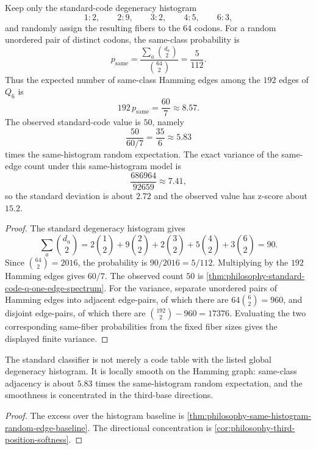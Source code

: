 \begin{theorem}
\label{thm:philosophy-same-histogram-random-edge-baseline}
Keep only the standard-code degeneracy histogram
$$
  1:2,\qquad 2:9,\qquad 3:2,\qquad 4:5,\qquad 6:3,
$$
and randomly assign the resulting fibers to the $64$ codons. For a
random unordered pair of distinct codons, the same-class probability is
$$
  p_{\mathrm{same}}
  =
  \frac{\sum_{a}\binom{d_{a}}{2}}{\binom{64}{2}}
  =
  \frac{5}{112}.
$$
Thus the expected number of same-class Hamming edges among the $192$
edges of $Q_{6}$ is
$$
  192\,p_{\mathrm{same}}
  =
  \frac{60}{7}
  \approx 8.57.
$$
The observed standard-code value is $50$, namely
$$
  \frac{50}{60/7}=\frac{35}{6}\approx5.83
$$
times the same-histogram random expectation.
The exact variance of the same-edge count under this same-histogram
model is
$$
  \frac{686964}{92659}\approx7.41,
$$
so the standard deviation is about $2.72$ and the observed value has
z-score about $15.2$.
\end{theorem}
\begin{proof}
The standard degeneracy histogram gives
$$
  \sum_{a}\binom{d_{a}}{2}
  =
  2\binom{1}{2}
  +9\binom{2}{2}
  +2\binom{3}{2}
  +5\binom{4}{2}
  +3\binom{6}{2}
  =
  90.
$$
Since $\binom{64}{2}=2016$, the probability is
$90/2016=5/112$. Multiplying by the $192$ Hamming edges gives $60/7$.
The observed count $50$ is
\autoref{thm:philosophy-standard-code-q-one-edge-spectrum}.
For the variance, separate unordered pairs of Hamming edges into
adjacent edge-pairs, of which there are $64\binom{6}{2}=960$, and
disjoint edge-pairs, of which there are
$\binom{192}{2}-960=17376$. Evaluating the two corresponding
same-fiber probabilities from the fixed fiber sizes gives the displayed
finite variance.
\end{proof}

\begin{corollary}
\label{cor:philosophy-local-edge-smoothness-not-histogram-artifact}
The standard classifier is not merely a code table with the listed
global degeneracy histogram. It is locally smooth on the Hamming graph:
same-class adjacency is about $5.83$ times the same-histogram random
expectation, and the smoothness is concentrated in the third-base
directions.
\end{corollary}
\begin{proof}
The excess over the histogram baseline is
\autoref{thm:philosophy-same-histogram-random-edge-baseline}. The
directional concentration is
\autoref{cor:philosophy-third-position-softness}.
\end{proof}


